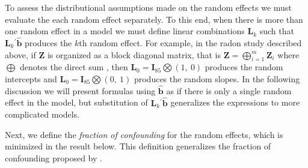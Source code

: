 \documentclass{article} %
\newcommand{\al}[1]{{\color{red} #1}}
\newtheorem{definition}{Definition}
\newcommand{\trans}{\ensuremath{^\prime}}
\newcommand{\var}{\ensuremath{\mathrm{Var}}}
\begin{document}
\al{
To assess the distributional assumptions made on the random effects we must evaluate the each random effect separately. To this end, when there is more than one random effect in a model we must define linear combinations $\bm{L}_k$ such that $\bm{L}_k\trans \widehat{\bm{b}}$ produces the $k$th random effect. For example, in the radon study described above, if $\bm{Z}$ is organized as a block diagonal matrix, that is $\bm{Z} = \bigoplus_{i=1}^{m} \bm{Z}_{i}$ where $\bigoplus$ denotes the direct sum \citep[page 47]{Gentle:2007}, then $\bm{L}_0 = \bm{I}_{85} \bigotimes ( 1,\ 0)$ produces the random intercepts and $\bm{L}_0 = \bm{I}_{85} \bigotimes ( 0,\ 1)$ produces the random slopes. In the following discussion we will present formulas using $\widehat{\bm{b}}$ as if there is only a single random effect in the model, but substitution of $\bm{L}_k\trans \widehat{\bm{b}}$ generalizes the expressions to more complicated models.

Next, we define the \emph{fraction of confounding} for the random effects, which is minimized in the result below. This definition generalizes the fraction of confounding proposed by \cite{HildenMinton:1995wh}.} \\

%

\end{document}
